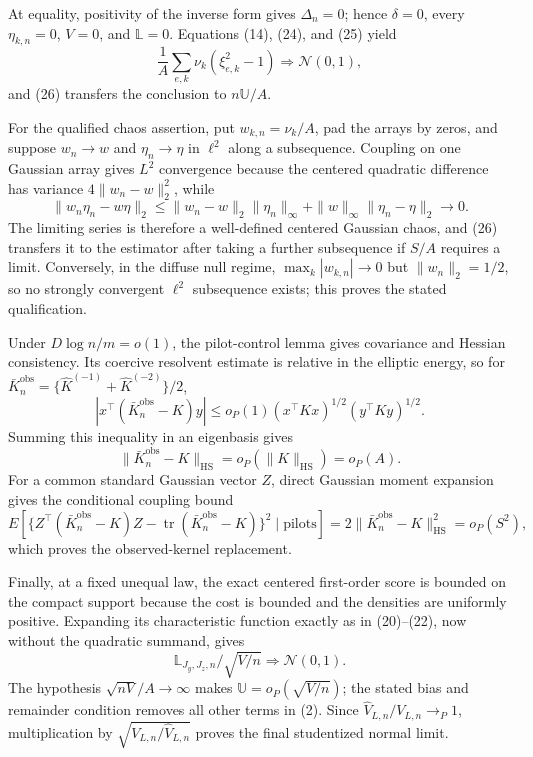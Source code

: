 At equality, positivity of the inverse form gives \(\Delta_n=0\); hence \(\delta=0\), every \(\eta_{k,n}=0\), \(V=0\), and \(\mathbb L=0\).  Equations (14), (24), and (25) yield
\[
\frac1A\sum_{e,k}\nu_k(\xi_{e,k}^2-1)\Rightarrow\mathcal N(0,1),
\]
and (26) transfers the conclusion to \(n\mathbb U/A\).

For the qualified chaos assertion, put \(w_{k,n}=\nu_k/A\), pad the arrays by zeros, and suppose \(w_n\to w\) and \(\eta_n\to\eta\) in \(\ell^2\) along a subsequence.  Coupling on one Gaussian array gives \(L^2\) convergence because the centered quadratic difference has variance \(4\|w_n-w\|_2^2\), while
\[
\|w_n\eta_n-w\eta\|_2
\le\|w_n-w\|_2\|\eta_n\|_\infty
+\|w\|_\infty\|\eta_n-\eta\|_2\to0.                                  \tag{27}
\]
The limiting series is therefore a well-defined centered Gaussian chaos, and (26) transfers it to the estimator after taking a further subsequence if \(S/A\) requires a limit.  Conversely, in the diffuse null regime, \(\max_k|w_{k,n}|\to0\) but \(\|w_n\|_2=1/2\), so no strongly convergent \(\ell^2\) subsequence exists; this proves the stated qualification.

Under \(D\log n/m=o(1)\), the pilot-control lemma gives covariance and Hessian consistency.  Its coercive resolvent estimate is relative in the elliptic energy, so for \(\bar K_n^{\mathrm{obs}}=\{\widehat K^{(-1)}+\widehat K^{(-2)}\}/2\),
\[
|x^\top(\bar K_n^{\mathrm{obs}}-K)y|
\le o_P(1)(x^\top Kx)^{1/2}(y^\top Ky)^{1/2}.
\]
Summing this inequality in an eigenbasis gives
\[
\|\bar K_n^{\mathrm{obs}}-K\|_{\mathrm{HS}}
=o_P(\|K\|_{\mathrm{HS}})=o_P(A).                                        \tag{28}
\]
For a common standard Gaussian vector \(Z\), direct Gaussian moment expansion gives the conditional coupling bound
\[
E\left[\{Z^\top(\bar K_n^{\mathrm{obs}}-K)Z
-\operatorname{tr}(\bar K_n^{\mathrm{obs}}-K)\}^2\mid\text{pilots}\right]
=2\|\bar K_n^{\mathrm{obs}}-K\|_{\mathrm{HS}}^2=o_P(S^2),
\]
which proves the observed-kernel replacement.

Finally, at a fixed unequal law, the exact centered first-order score is bounded on the compact support because the cost is bounded and the densities are uniformly positive.  Expanding its characteristic function exactly as in (20)--(22), now without the quadratic summand, gives
\[
\mathbb L_{J_y,J_z,n}/\sqrt{V/n}\Rightarrow\mathcal N(0,1).
\]
The hypothesis \(\sqrt{nV}/A\to\infty\) makes \(\mathbb U=o_P(\sqrt{V/n})\); the stated bias and remainder condition removes all other terms in (2).  Since \(\widehat V_{L,n}/V_{L,n}\to_P1\), multiplication by \(\sqrt{V_{L,n}/\widehat V_{L,n}}\) proves the final studentized normal limit.